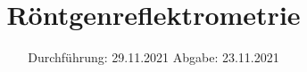 
\setlength\parindent{0pt}
\subject{V44}
\title{Röntgenreflektrometrie}
\date{%
  Durchführung: 29.11.2021
  \hspace{3em}
  Abgabe: 23.11.2021 \\
}



\maketitle
\thispagestyle{empty}
\tableofcontents
\newpage







\newpage
\nocite{*}
\printbibliography
\appendix



